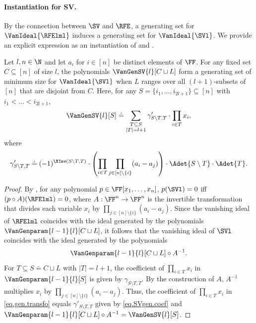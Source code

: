 \documentclass{toc}
\begin{document}
\paragraph{Instantiation for SV.}
By the connection between $\SV$ and $\RFE$, a generating set for $\VanIdeal{\RFElml}$ induces a generating set for $\VanIdeal{\SVl}$. We provide an explicit expression as an instantiation of  and . 

\begin{corollary}\label{cor-gen-sv}
 Let $l, n \in \N$ and let $a_i$ for $i \in [n]$ be distinct elements of $\FF$.
 For any fixed set $C \subseteq [n]$ of size $l$, the polynomials $\VanGenSV{l}[C \sqcup L]$ form a generating set
 of minimum size for $\VanIdeal{\SVl}$ when $L$ ranges over all $(l+1)$-subsets of $[n]$ that are disjoint from $C$. Here, for any $S = \{i_1, \dots, i_{2l+1}\} \subseteq [n]$ with $i_1 < \dots < i_{2l+1}$,
 \[
 \VanGenSV{l}[S] \doteq \sum_{\substack{T \subseteq S \\ |T|=l+1}} \gamma'_{S \setminus T,T} \cdot \prod_{i \in
 T} x_i,
 \]
 where
 \begin{equation}\label{eq.SVgen.coef}
 \gamma'_{S \setminus T,T} \doteq (-1)^{\XInv(S \setminus T,T)} \cdot \left(\prod_{i \in T}\prod_{j \in [n]\setminus \{i\}} (a_i-a_{j})\right) \cdot 
 \Adet{S\setminus T} \cdot \Adet{T}.
\end{equation}
\end{corollary}

\begin{proof}
By , for any polynomial \(p\in\FF[x_1,\ldots,x_n]\), \(p(\SVl) = 0\) iff \((p\circ A)(\RFElml) = 0\), where $A:\FF^n\to \FF^n$ is the invertible transformation that divides each variable $x_i$ by $\prod_{j\in [n]\setminus \{i\}} (a_i-a_j)$. Since the vanishing ideal of $\RFElml$ coincides with the ideal generated by the polynomials $\VanGenparam{l-1}{l}[C \sqcup L]$, it follows that the vanishing ideal of $\SVl$ coincides with the ideal generated by the polynomials 
\begin{equation}\label{eq.gen.transfo}
\VanGenparam{l-1}{l}[C \sqcup L] \circ A^{-1}.
\end{equation} 
For $T \subseteq S \doteq C \sqcup L$ with $|T|=l+1$, the coefficient of $\prod_{i \in T} x_i$ in $\VanGenparam{l-1}{l}[S]$ is given by $\gamma_{S \setminus T, T}$. By the construction of $A$, $A^{-1}$ multiplies $x_i$ by $\prod_{j\in [n]\setminus \{i\}} (a_i-a_j)$. Thus, the coefficient of $\prod_{i \in T} x_i$ in \eqref{eq.gen.transfo} equals $\gamma'_{S\setminus T, T}$ given by \eqref{eq.SVgen.coef} and 
$\VanGenparam{l-1}{l}[C \sqcup L] \circ A^{-1} = \VanGenSV{l}[S]$.
\end{proof}
\end{document}
